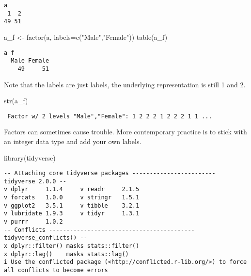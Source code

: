 \documentclass[
  letterpaper,
  DIV=11,
  numbers=noendperiod]{scrreprt}
\newenvironment{Shaded}{\begin{snugshade}}{\end{snugshade}}
\newcommand{\AttributeTok}[1]{\textcolor[rgb]{0.40,0.45,0.13}{#1}}
\newcommand{\FunctionTok}[1]{\textcolor[rgb]{0.28,0.35,0.67}{#1}}
\newcommand{\NormalTok}[1]{\textcolor[rgb]{0.00,0.23,0.31}{#1}}
\newcommand{\OtherTok}[1]{\textcolor[rgb]{0.00,0.23,0.31}{#1}}
\newcommand{\StringTok}[1]{\textcolor[rgb]{0.13,0.47,0.30}{#1}}
\begin{document}
\begin{verbatim}
a
 1  2 
49 51 
\end{verbatim}

\begin{Shaded}
\begin{Highlighting}[]
\NormalTok{a\_f }\OtherTok{\textless{}{-}} \FunctionTok{factor}\NormalTok{(a, }\AttributeTok{labels=}\FunctionTok{c}\NormalTok{(}\StringTok{"Male"}\NormalTok{,}\StringTok{"Female"}\NormalTok{))}
\FunctionTok{table}\NormalTok{(a\_f)}
\end{Highlighting}
\end{Shaded}

\begin{verbatim}
a_f
  Male Female 
    49     51 
\end{verbatim}

Note that the labels are just labels, the underlying representation is
still 1 and 2.

\begin{Shaded}
\begin{Highlighting}[]
\FunctionTok{str}\NormalTok{(a\_f)}
\end{Highlighting}
\end{Shaded}

\begin{verbatim}
 Factor w/ 2 levels "Male","Female": 1 2 2 2 1 2 2 2 1 1 ...
\end{verbatim}

Factors can sometimes cause trouble. More contemporary practice is to
stick with an integer data type and add your own labels.

\begin{Shaded}
\begin{Highlighting}[]
\FunctionTok{library}\NormalTok{(tidyverse)}
\end{Highlighting}
\end{Shaded}

\begin{verbatim}
-- Attaching core tidyverse packages ------------------------ tidyverse 2.0.0 --
v dplyr     1.1.4     v readr     2.1.5
v forcats   1.0.0     v stringr   1.5.1
v ggplot2   3.5.1     v tibble    3.2.1
v lubridate 1.9.3     v tidyr     1.3.1
v purrr     1.0.2     
-- Conflicts ------------------------------------------ tidyverse_conflicts() --
x dplyr::filter() masks stats::filter()
x dplyr::lag()    masks stats::lag()
i Use the conflicted package (<http://conflicted.r-lib.org/>) to force all conflicts to become errors
\end{verbatim}
\end{document}
